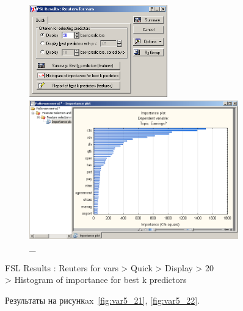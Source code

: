 \begin{figure}[!h]
  \centering

  \begin{minipage}{0.29\textwidth}
    \centering

    \includegraphics[height=4cm]
    {inc/var5/19.PNG}

    \caption{\_}

    \label{fig:var5_19}
  \end{minipage}
  \begin{minipage}{0.69\textwidth}
    \centering

    \includegraphics[height=6cm]
    {inc/var5/20.PNG}

    \caption{\_}

    \label{fig:var5_20}
  \end{minipage}
\end{figure}

FSL Results : Reuters for vars > Quick > Display > 20 \\
> Histogram of importance for best k predictors

Результаты на рисункax~\ref{fig:var5_21}, \ref{fig:var5_22}.

